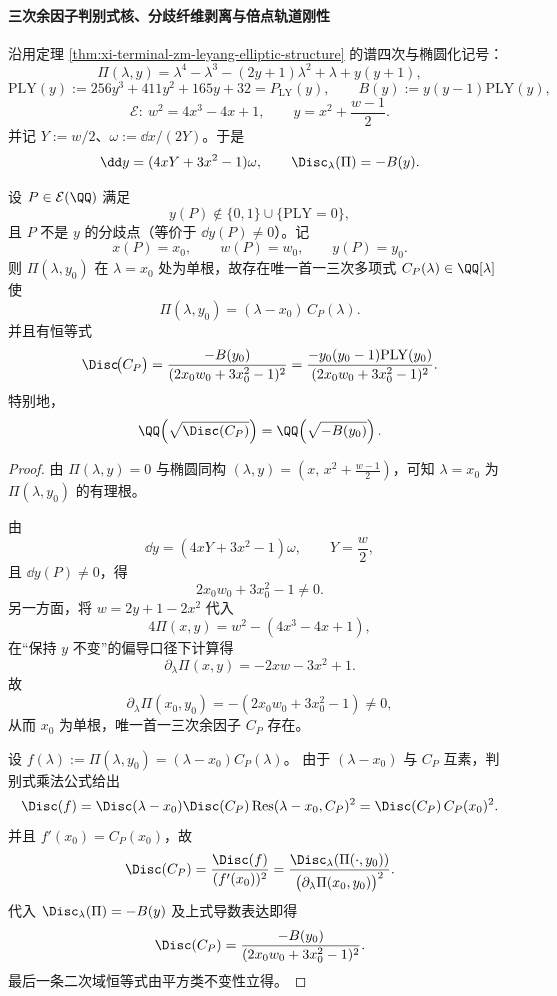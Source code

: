 \paragraph{三次余因子判别式核、分歧纤维剥离与倍点轨道刚性}\label{par:xi-terminal-zm-cubic-cofactor-discriminant-kernel-s3-rigidity-height}
沿用定理 \ref{thm:xi-terminal-zm-leyang-elliptic-structure} 的谱四次与椭圆化记号：
\[
\Pi(\lambda,y)=\lambda^4-\lambda^3-(2y+1)\lambda^2+\lambda+y(y+1),
\]
\[
\mathrm{PLY}(y):=256y^3+411y^2+165y+32=P_{\mathrm{LY}}(y),
\qquad
B(y):=y(y-1)\mathrm{PLY}(y),
\]
\[
\mathcal E:\ w^2=4x^3-4x+1,\qquad
y=x^2+\frac{w-1}{2}.
\]
并记 \(Y:=w/2\)、\(\omega:=\dd x/(2Y)\)。于是
\[
\dd y=(4xY+3x^2-1)\omega,\qquad
\Disc_{\lambda}(\Pi)=-B(y).
\]

\begin{theorem}[三次余因子判别式的导数平方消去公式]\label{thm:xi-terminal-zm-cubic-cofactor-disc-derivative-square-elimination}
设 \(P\in \mathcal E(\QQ)\) 满足
\[
y(P)\notin \{0,1\}\cup\{\mathrm{PLY}=0\},
\]
且 \(P\) 不是 \(y\) 的分歧点（等价于 \(\dd y(P)\neq 0\)）。记
\[
x(P)=x_0,\qquad w(P)=w_0,\qquad y(P)=y_0.
\]
则 \(\Pi(\lambda,y_0)\) 在 \(\lambda=x_0\) 处为单根，故存在唯一首一三次多项式 \(C_P(\lambda)\in\QQ[\lambda]\) 使
\[
\Pi(\lambda,y_0)=(\lambda-x_0)\,C_P(\lambda).
\]
并且有恒等式
\[
\Disc\!\bigl(C_P\bigr)
=\frac{-B(y_0)}{(2x_0w_0+3x_0^2-1)^2}
=\frac{-y_0(y_0-1)\mathrm{PLY}(y_0)}{(2x_0w_0+3x_0^2-1)^2}.
\]
特别地，
\[
\QQ\!\left(\sqrt{\Disc(C_P)}\right)=\QQ\!\left(\sqrt{-B(y_0)}\right).
\]
\end{theorem}
\begin{proof}
由 \(\Pi(\lambda,y)=0\) 与椭圆同构 \((\lambda,y)=(x,\,x^2+\frac{w-1}{2})\)，可知 \(\lambda=x_0\) 为 \(\Pi(\lambda,y_0)\) 的有理根。

由
\[
\dd y=(4xY+3x^2-1)\omega,\qquad Y=\frac{w}{2},
\]
且 \(\dd y(P)\neq 0\)，得
\[
2x_0w_0+3x_0^2-1\neq 0.
\]
另一方面，将 \(w=2y+1-2x^2\) 代入
\[
4\Pi(x,y)=w^2-(4x^3-4x+1),
\]
在“保持 \(y\) 不变”的偏导口径下计算得
\[
\partial_{\lambda}\Pi(x,y)=-2xw-3x^2+1.
\]
故
\[
\partial_{\lambda}\Pi(x_0,y_0)=-(2x_0w_0+3x_0^2-1)\neq 0,
\]
从而 \(x_0\) 为单根，唯一首一三次余因子 \(C_P\) 存在。

设 \(f(\lambda):=\Pi(\lambda,y_0)=(\lambda-x_0)C_P(\lambda)\)。
由于 \((\lambda-x_0)\) 与 \(C_P\) 互素，判别式乘法公式给出
\[
\Disc(f)=\Disc(\lambda-x_0)\Disc(C_P)\operatorname{Res}(\lambda-x_0,C_P)^2
=\Disc(C_P)\,C_P(x_0)^2.
\]
并且 \(f' (x_0)=C_P(x_0)\)，故
\[
\Disc(C_P)=\frac{\Disc(f)}{(f'(x_0))^2}
=\frac{\Disc_{\lambda}(\Pi(\cdot,y_0))}{\bigl(\partial_{\lambda}\Pi(x_0,y_0)\bigr)^2}.
\]
代入 \(\Disc_{\lambda}(\Pi)=-B(y)\) 及上式导数表达即得
\[
\Disc(C_P)=\frac{-B(y_0)}{(2x_0w_0+3x_0^2-1)^2}.
\]
最后一条二次域恒等式由平方类不变性立得。
\end{proof}

